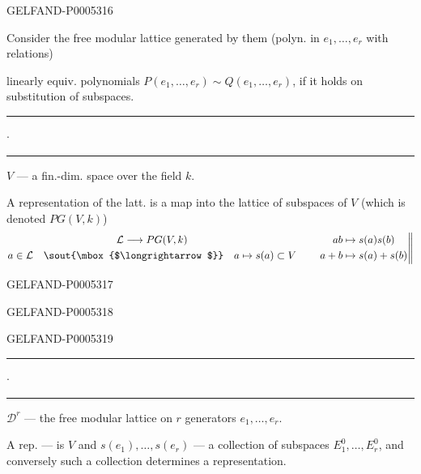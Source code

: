 \begin{GelfandAdjacentEvidence}{GELFAND-P000531}{6}

Consider the free modular lattice generated by them (polyn. in $e_1,\ldots,e_r$ with relations)

linearly equiv. polynomials $P(e_1,\ldots,e_r)\sim Q(e_1,\ldots,e_r)$, if it holds on substitution of subspaces.

\hfill\rule{.9cm}{.35pt}\enspace\(\cdot\)\enspace\rule{1.25cm}{.35pt}\par

$V$ — a fin.-dim. space over the field $k$.

A representation of the latt. is a map into the lattice of subspaces of $V$ (which is denoted $PG(V,k)$)
\[
\begin{gathered}
\mathcal L\longrightarrow PG(V,k)\\
a\in\mathcal L\quad\text{\sout{\mbox{$\longrightarrow$}}}\quad a\mapsto s(a)\subset V
\end{gathered}
\qquad
\left.\begin{aligned}
ab&\mapsto s(a)s(b)\\
a+b&\mapsto s(a)+s(b)
\end{aligned}\right\Vert
\]
\end{GelfandAdjacentEvidence}
\begin{GelfandAdjacentEvidence}{GELFAND-P000531}{7}

\end{GelfandAdjacentEvidence}
\begin{GelfandAdjacentEvidence}{GELFAND-P000531}{8}

\end{GelfandAdjacentEvidence}
\begin{GelfandAdjacentEvidence}{GELFAND-P000531}{9}


\hfill\rule{.9cm}{.35pt}\enspace\(\cdot\)\enspace\rule{1.25cm}{.35pt}\par

$\mathcal D^r$ — the free modular lattice on $r$ generators $e_1,\ldots,e_r$.

A rep. — is $V$ and $s(e_1),\ldots,s(e_r)$ — a collection of subspaces $E_1^0,\ldots,E_r^0$,
and conversely such a collection determines a representation.
\end{GelfandAdjacentEvidence}

